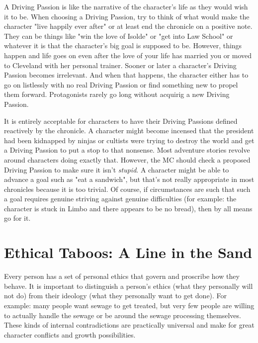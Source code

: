 A Driving Passion is like the narrative of the character's life as they would wish it to be. When choosing a Driving Passion, try to think of what would make the character "live happily ever after" or at least end the chronicle on a positive note. They can be things like "win the love of Isolde" or "get into Law School" or whatever it is that the character's big goal is supposed to be. However, things happen and life goes on even after the love of your life has married you or moved to Cleveland with her personal trainer. Sooner or later a character's Driving Passion becomes irrelevant. And when that happens, the character either has to go on listlessly with no real Driving Passion or find something new to propel them forward. Protagonists rarely go long without acquirig a new Driving Passion.

It is entirely acceptable for characters to have their Driving Passions defined reactively by the chronicle. A character might become incensed that the president had been kidnapped by ninjas or cultists were trying to destroy the world and get a Driving Passion to put a stop to that nonsense. Most adventure stories revolve around characters doing exactly that. However, the MC should check a proposed Driving Passion to make sure it isn't \textit{stupid}. A character might be able to advance a goal such as "eat a sandwich", but that's not really appropriate in most chronicles because it is too trivial. Of course, if circumstances are such that such a goal requires genuine striving against genuine difficulties (for example: the character is stuck in Limbo and there appears to be no bread), then by all means go for it.

\section[Ethical Taboos]{Ethical Taboos: A Line in the Sand}

Every person has a set of personal ethics that govern and proscribe how they behave. It is important to distinguish a person's ethics (what they personally will not do) from their ideology (what they personally want to get done). For example: many people want sewage to get treated, but very few people are willing to actually handle the sewage or be around the sewage processing themselves. These kinds of internal contradictions are practically universal and make for great character conflicts and growth possibilities.

